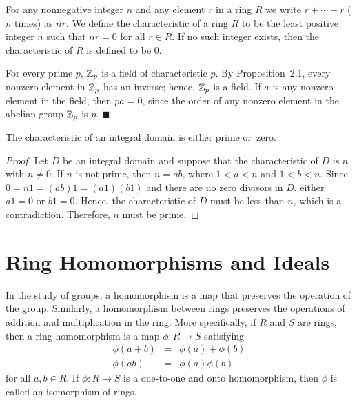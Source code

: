  
\vspace{2ex}
 
 
For any nonnegative integer $n$ and any element $r$ in a ring $R$ we 
write $r + \cdots + r$ ($n$ times) as $nr$. We  define the {\bfi
characteristic\/}\label{ringchar} of a ring $R$ to 
be the least positive integer $n$ such that $nr=0$ for all $r \in R$.
If no such integer exists, then the characteristic of $R$ is defined
to be 0.  
 
 
\vspace{2ex}
 
 
For every prime $p$, ${\Bbb Z}_p$ is a field of characteristic $p$. By
Proposition~2.1, every nonzero element in ${\Bbb Z}_p$ has an inverse;
hence, ${\Bbb Z}_p$ is a field. If $a$ is any nonzero element in the
field, then $pa =0$, since the order of any nonzero element in the
abelian group ${\Bbb Z}_p$ is $p$. 
\hspace{\fill} $\blacksquare$
 
 
\begin{theorem}
The characteristic of an integral domain is either prime or~zero.
\end{theorem}
 
 
\begin{proof}
Let $D$ be an integral domain and suppose that the characteristic of
$D$ is $n$ with $n \neq 0$. If $n$ is not prime, then $n = ab$, where
$1 < a <n$ and $1 < b < n$. Since $0 = n 1 = (ab)1 = (a1)(b1)$ and
there are no zero divisors in $D$, either $a1 =0$ or $b1=0$. Hence,
the characteristic of $D$ must be less than $n$, which is a
contradiction.  Therefore, $n$ must be prime. 
\end{proof}
 
 
 
\section{Ring Homomorphisms and Ideals}
 
 
In the study of groups, a homomorphism is a map that preserves the
operation of the group.  Similarly, a homomorphism between rings
preserves the operations of addition and multiplication in the ring.
More specifically, if  $R$ and $S$ are rings, then   a {\bfi ring
homomorphism\/} is a
map $\phi : R \rightarrow S$ satisfying  
\begin{eqnarray*}
\phi( a + b ) & = & \phi( a ) + \phi(b) \\
\phi( a b ) & = & \phi( a ) \phi(b)
\end{eqnarray*}
for all $a, b \in R$.  
If $\phi : R \rightarrow S$ is a one-to-one and onto homomorphism,
then $\phi$ is called an {\bfi
isomorphism\/} of rings.   
 
